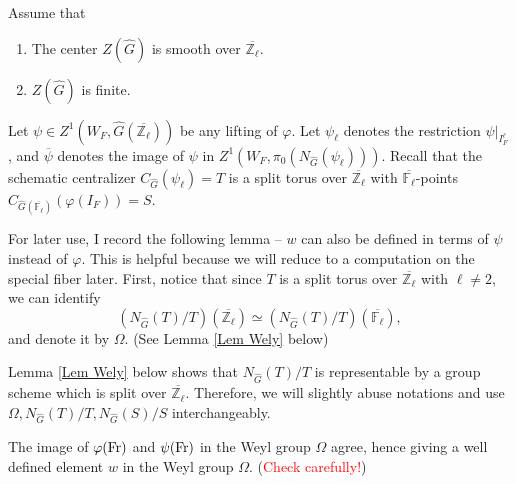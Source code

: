 Assume that 
\begin{enumerate}
	\item \label{assumption 1} The center $Z(\hat{G})$ is smooth over $\overline{\mathbb{Z}_{\ell}}$.
	\item \label{assumption 2} $Z(\hat{G})$ is finite.
\end{enumerate}

Let $\psi \in Z^1(W_F, \hat{G}(\overline{\mathbb{Z}_{\ell}}))$ be any lifting of $\varphi$. Let $\psi_{\ell}$ denotes the restriction $\psi|_{I_F^{\ell}}$, and $\overline{\psi}$ denotes the image of $\psi$ in $Z^1(W_F, \pi_0(N_{\hat{G}}(\psi_{\ell})))$. Recall that the schematic centralizer $C_{\hat{G}}(\psi_{\ell})=T$ is a split torus over $\overline{\mathbb{Z}_{\ell}}$ with $\overline{\mathbb{F}_{\ell}}$-points $C_{\hat{G}(\overline{\mathbb{F}_{\ell}})}(\varphi(I_F)) = S$. 

For later use, I record the following lemma -- $w$ can also be defined in terms of $\psi$ instead of $\varphi$. This is helpful because we will reduce to a computation on the special fiber later. First, notice that since $T$ is a split torus over $\overline{\mathbb{Z}_{\ell}}$ with $\ell \neq 2$, we can identify
$$\left(N_{\hat{G}}(T)/T\right)(\overline{\mathbb{Z}_{\ell}}) \simeq \left(N_{\hat{G}}(T)/T\right)(\overline{\mathbb{F}_{\ell}}),$$
and denote it by $\Omega$. (See Lemma \ref{Lem Wely} below) 

\begin{remark}
	Lemma \ref{Lem Wely} below shows that $N_{\hat{G}}(T)/T$ is representable by a group scheme which is split over $\overline{\mathbb{Z}_{\ell}}$. Therefore, we will slightly abuse notations and use $\Omega, N_{\hat{G}}(T)/T, N_{\hat{G}}(S)/S$ interchangeably.
\end{remark}

\begin{lemma}
	The image of $\varphi(\operatorname{Fr})$ and $\psi(\operatorname{Fr})$ in the Weyl group $\Omega$ agree, hence giving a well defined element $w$ in the Weyl group $\Omega$. (\textcolor{red}{Check carefully!})
\end{lemma}

